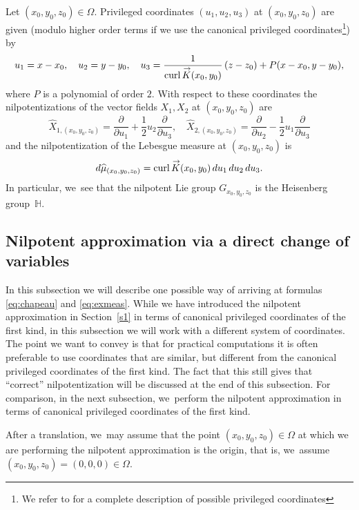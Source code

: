 \documentclass[11pt]{article}
\DeclareMathOperator{\curl}{curl}
\renewcommand{\vec}[1]
{\overset{\,{\raisebox{-2pt}{$\scriptstyle\to$}}}{#1}}
\theoremstyle{definition}
\newcommand{\1}{\mathbbm{1}}
\numberwithin{equation}{section}
\begin{document}
Let $(x_0,y_0,z_0)\in\Omega$. Privileged coordinates $(u_1,u_2,u_3)$ at $(x_0,y_0,z_0)$ are given (modulo higher order terms if we use the canonical privileged coordinates\footnote{We refer to \cite{ChoPo1,ChoPo2} for a complete description of possible privileged coordinates}) by
\begin{equation} \label{eq:cdv}
u_1= x-x_0,\quad u_2 = y-y_0,\quad u_3 = \frac{1}{\curl \vec{K} (x_0,y_0)} \,(z-z_0) + P (x-x_0,y-y_0),
\end{equation}
where $P$ is a polynomial of order $2$. With respect to these coordinates the nilpotentizations of the vector fields $X_1,X_2$ at $(x_0,y_0,z_0)$ are
\begin{equation}\label{eq:chapeau}
\widehat X_{1,(x_0,y_0,z_0)} = \frac{\partial}{\partial u_1} + \frac 12 u_2 \frac{\partial}{\partial u_3},\quad
\widehat X_{2,(x_0,y_0,z_0)} = \frac{\partial}{\partial u_2} - \frac 12 u_1 \frac{\partial}{\partial u_3}
\end{equation}
and the nilpotentization of the Lebesgue measure at $(x_0,y_0,z_0)$ is
\begin{equation}\label{eq:exmeas}
d\widehat\mu_{(x_0,y_0,z_0)} = \curl \vec{K} (x_0,y_0)\,du_1 \,du_2 \,du_3.
\end{equation}
In particular, we~see that the nilpotent Lie group $G_{x_0,y_0,z_0}$ is the Heisenberg group~$\mathbb H$.

\subsection{Nilpotent approximation via a direct change of variables}
In this subsection we will describe one possible way of arriving at formulas \eqref{eq:chapeau} and \eqref{eq:exmeas}. While we have introduced the nilpotent approximation in Section~\ref{s1} in terms of canonical privileged coordinates of the first kind, in this subsection we will work with a different system of coordinates. The point we want to convey is that for practical computations it is often preferable to use coordinates that are similar, but different from the canonical privileged coordinates of the first kind. The fact that this still gives that ``correct'' nilpotentization will be discussed at the end of this subsection. For comparison, in the next subsection, we~perform the nilpotent approximation in terms of canonical privileged coordinates of the first kind.

After a translation, we~may assume that the point $(x_0,y_0,z_0)\in\Omega$ at which we are performing the nilpotent approximation is the origin, that is, we~assume $(x_0,y_0,z_0)= (0,0,0) \in \Omega$.
\end{document}
